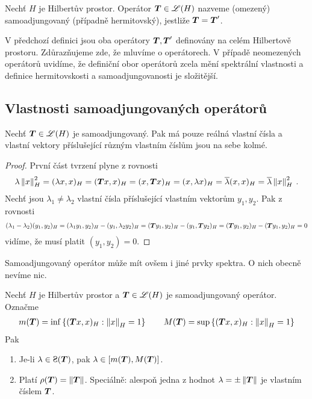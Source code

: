 \begin{definition}
Nechť $H$ je Hilbertův prostor. Operátor $\boldsymbol{T} \in \mathscr{L}(H)$ nazveme (omezený) samoadjungovaný  (případně hermitovský), jestliže $\boldsymbol{T} = \boldsymbol{T}'$.
\end{definition}
\begin{remark}
V předchozí definici jsou oba operátory $\boldsymbol{T}, \boldsymbol{T}'$ definovány na celém Hilbertově prostoru. Zdůrazňujeme zde, že mluvíme o  operátorech. V případě neomezených operátorů uvidíme, že definiční obor operátorů zcela mění spektrální vlastnosti a definice hermitovskosti a samoadjungovanosti je složitější.
\end{remark}

\subsection{Vlastnosti samoadjungovaných operátorů}

\begin{lemma}
Nechť $\boldsymbol{T} \in \mathscr{L} (H)$ je samoadjungovaný. Pak má pouze reálná vlastní čísla a vlastní vektory příslušející různým vlastním číslům jsou na sebe kolmé.
\end{lemma}
\begin{proof}
První část tvrzení plyne z rovnosti \begin{align*}
\lambda \left\lVert x\right\rVert^2_H = (\lambda x, x)_H = (\boldsymbol{T} x,x)_H = (x, \boldsymbol{T} x)_H = (x, \lambda x)_H = \overline{\lambda} (x,x)_H = \overline{\lambda} \left\lVert x\right\rVert_H ^2 \:.
\end{align*}
Nechť jsou $\lambda_1 \neq \lambda_2$ vlastní čísla příslušející vlastním vektorům $y_1,y_2$. Pak z rovnosti \begin{align*}
    (\lambda_1 - \lambda_2)(y_1,y_2)_H = (\lambda_1 y_1,y_2)_H - (y_1, \lambda_2 y_2)_H = (\boldsymbol{T} y_1, y_2)_H - (y_1, \boldsymbol{T} y_2)_H = (\boldsymbol{T} y_1,y_2)_H - (\boldsymbol{T} y_1,y_2)_H = 0
\end{align*}
vidíme, že musí platit $(y_1,y_2)=0$.
\end{proof}
\begin{remark}
Samoadjungovaný operátor může mít ovšem i jiné prvky spektra. O nich obecně nevíme nic.
\end{remark}
\begin{theorem}
Nechť $H$ je Hilbertův prostor a $\boldsymbol{T} \in \mathscr{L} (H)$ je samoadjungovaný operátor. Označme \begin{align*}
    m(\boldsymbol{T}) = \inf \left \lbrace (\boldsymbol{T} x,x)_H : \left\lVert x\right\rVert_H = 1 \right \rbrace \qquad M(\boldsymbol{T}) = \sup \left \lbrace (\boldsymbol{T} x,x)_H : \left\lVert x\right\rVert_H = 1 \right \rbrace
\end{align*} Pak \begin{enumerate}
    \item Je-li $\lambda \in \Sp(\map T)$, pak $\lambda \in [m(\boldsymbol{T}), M(\boldsymbol{T})]$.
    \item Platí $\rho(\boldsymbol{T}) = \left\lVert\boldsymbol{T}\right\rVert$. Speciálně: alespoň jedna z hodnot $\lambda = \pm \left\lVert\boldsymbol{T}\right\rVert$ je vlastním číslem $\boldsymbol{T}$.
\end{enumerate}
\end{theorem} 

